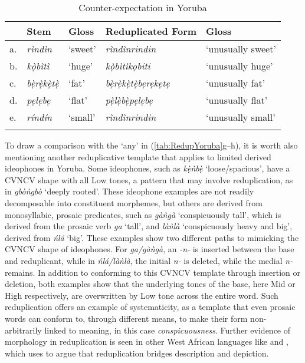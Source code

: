 \documentclass[output=paper,colorlinks,citecolor=brown]{langscibook}
\begin{document}
\begin{table}
\caption{Counter-expectation in Yoruba}
\label{tab:CounterexpectationYoruba}
 \begin{tabularx}{.9\textwidth}{lllll}
  \lsptoprule
 &  Stem & Gloss & Reduplicated Form    & Gloss           \\
 \midrule
a. & \textit{rìndìn}         & `sweet' & \textit{rìndìnrindin}         & `unusually sweet' \\
b. & \textit{kọ̀bìtì  }      & `huge'  & \textit{kọ̀bìtìkọbiti }       & `unusually huge'  \\
c. & \textit{bẹ̀rẹ̀kẹ̀tẹ̀}   & `fat'   & \textit{bẹ̀rẹ̀kẹ̀tẹ̀bẹrẹkẹtẹ} & `unusually fat'   \\
d. & \textit{pẹlẹbẹ  }       & `flat'  & \textit{pẹ̀lẹ̀bẹ̀pẹlẹbẹ }     & `unusually flat'  \\
e. & \textit{ríndín }        & `small' & \textit{rìndìnrindin     }    & `unusually small' \\
\lspbottomrule
 \end{tabularx}
\end{table}

\begin{sloppypar}
To draw a comparison with the ‘any’  in (\ref{tab:RedupYoruba}g--h), it is worth also mentioning another reduplicative template that applies to limited derived ideophones in Yoruba. Some ideophones, such as \textit{kẹ̀ǹbẹ̀} ‘loose/spacious', have a CVNCV shape with all Low tones, a pattern that may involve reduplication, as in \textit{gbòǹgbò} ‘deeply rooted’. These ideophone examples are not readily decomposable into constituent morphemes, but others are derived from monosyllabic, prosaic predicates, such as \textit{gàǹgà} `conspicuously tall', which is derived from the prosaic verb \textit{ga} ‘tall', and \textit{làǹlà} `conspicuously heavy and big’, derived from \textit{ńlá} ‘big’. These examples show two different paths to mimicking the CVNCV  shape of ideophones. For \textit{ga/gàǹgà}, an \textit{-n-} is inserted between the base and reduplicant, while in \textit{ńlá/làǹlà}, the initial \textit{n-} is deleted, while the medial \textit{n-} remains. In addition to conforming to this CVNCV template through insertion or deletion, both examples show that the underlying tones of the base, here Mid or High respectively, are overwritten by Low tone across the entire word. Such reduplication offers an example of systematicity, as a template that even prosaic words can conform to, through different means, to make their form non-arbitrarily linked to meaning, in this case \textit{conspicuousness}. Further evidence of morphology in reduplication is seen in other West African languages like  and , which \citet{Dingemanse2015} uses to argue that reduplication bridges description and depiction.
\end{sloppypar}
\end{document}

